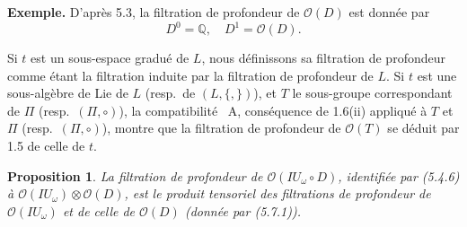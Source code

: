 \documentclass[11pt,a4paper]{article}
\theoremstyle{plain}
\newtheorem{proposition}[theorem]{Proposition}
\theoremstyle{definition}
\newcommand{\Q}{\mathbb{Q}}
\begin{document}
\noindent\textbf{Exemple.} D'apr\`es 5.3, la filtration de profondeur de $\mathcal{O}(D)$ est donn\'ee par
\begin{equation}\label{eq:5.7.1}
D^0 = \Q, \quad D^1 = \mathcal{O}(D).
\end{equation}

Si $t$ est un sous-espace gradu\'e de $L$, nous d\'efinissons sa filtration de profondeur comme \'etant la filtration induite par la filtration de profondeur de $L$. Si $t$ est une sous-alg\`ebre de Lie de $L$ (resp.~de $(L, \{,\})$), et $T$ le sous-groupe correspondant de $\Pi$ (resp.~$(\Pi, \circ)$), la compatibilit\'e \cite{1}~A, cons\'equence de 1.6(ii) appliqu\'e \`a $T$ et $\Pi$ (resp.~$(\Pi, \circ)$), montre que la filtration de profondeur de $\mathcal{O}(T)$ se d\'eduit par 1.5 de celle de $t$.

\begin{proposition}\label{prop:5.8}
La filtration de profondeur de $\mathcal{O}(IU_\omega \circ D)$, identifi\'ee par (5.4.6) \`a $\mathcal{O}(IU_\omega) \otimes \mathcal{O}(D)$, est le produit tensoriel des filtrations de profondeur de $\mathcal{O}(IU_\omega)$ et de celle de $\mathcal{O}(D)$ (donn\'ee par (5.7.1)).
\end{proposition}
\end{document}
